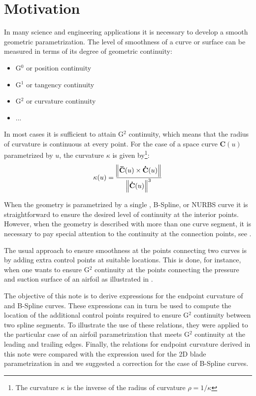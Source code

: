 \section{Motivation}
In many science and engineering applications it is necessary to develop a smooth geometric parametrization. The level of smoothness of a curve or surface can be measured in terms of its degree of geometric continuity:

\begin{itemize}
    \item G$^0$ or position continuity
    \item G$^1$ or tangency continuity
    \item G$^2$ or curvature continuity
    \item ...
\end{itemize}

In most cases it is sufficient to attain G$^2$ continuity, which means that the radius of curvature is continuous at every point. For the case of a space curve $\mathbf{C}(u)$ parametrized by $u$, the curvature $\kappa$ is given by\footnote{The curvature $\kappa$ is the inverse of the radius of curvature $\rho=1/\kappa$}:
\begin{align}
    \kappa(u) = \frac{\norm{\mathbf{\ddot{C}}(u) \times \mathbf{\dot{C}}(u)}}{\norm{\mathbf{\dot{C}}(u)}^3}
\end{align}

When the geometry is parametrized by a single \Bezier, B-Spline, or NURBS curve it is straightforward to ensure the desired level of continuity at the interior points. However, when the geometry is described with more than one curve segment, it is necessary to pay special attention to the continuity at the connection points, see .

The usual approach to ensure smoothness at the points connecting two curves is by adding extra control points at suitable locations.
This is done, for instance, when one wants to ensure G$^2$ continuity at the points connecting the pressure and suction surface of an airfoil as illustrated in .

The objective of this note is to derive expressions for the endpoint curvature of \Bezier and B-Spline curves. These expressions can in turn be used to compute the location of the additional control points required to ensure G$^2$ continuity between two spline segments. To illustrate the use of these relations, they were applied to the particular case of an airfoil parametrization that meets G$^2$ continuity at the leading and trailing edges. Finally, the relations for endpoint curvature derived in this note were compared with the expression used for the 2D blade parametrization in \textcite{Mykhaskiv2018} and we suggested a correction for the case of B-Spline curves.


 